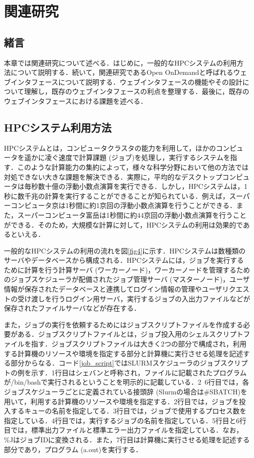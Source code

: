 
\section{関連研究}

\subsection{緒言}
本章では関連研究について述べる．はじめに，一般的なHPCシステムの利用方法について説明する．続いて，関連研究であるOpen OnDemandと呼ばれるウェブインタフェースについて説明する．ウェブインタフェースの機能やその設計について理解し，既存のウェブインタフェースの利点を整理する．最後に，既存のウェブインタフェースにおける課題を述べる．

\subsection{HPCシステム利用方法}
HPCシステムとは，コンピュータクラスタの能力を利用して，ほかのコンピュータを遥かに凌ぐ速度で計算課題 (ジョブ)を処理し，実行するシステムを指す．このような計算能力の集約によって，様々な科学分野において他の方法では対処できない大きな課題を解決できる．実際に，平均的なデスクトップコンピュータは毎秒数十億の浮動小数点演算を実行できる．しかし，HPCシステムは，1秒に数千兆の計算を実行することができることが知られている．例えば，スーパーコンピュータ京は1秒間に約1京回の浮動小数点演算を行うことができる\cite{kei}．また，スーパーコンピュータ富岳は1秒間に約44京回の浮動小数点演算を行うことができる\cite{hugaku}．そのため，大規模な計算に対して，HPCシステムの利用は効果的であるといえる．\par
一般的なHPCシステムの利用の流れを図\ref{fig4}に示す．HPCシステムは数種類のサーバやデータベースから構成される．HPCシステムには，ジョブを実行するために計算を行う計算サーバ (ワーカーノード)，ワーカーノードを管理するためのジョブスケジューラが配備されたジョブ管理サーバ (マスターノード)，ユーザ情報が保存されたデータベースと連携してログイン情報の管理やユーザリクエストの受け渡しを行うログイン用サーバ，実行するジョブの入出力ファイルなどが保存されたファイルサーバなどが存在する．\par
また，ジョブの実行を依頼するためにはジョブスクリプトファイルを作成する必要がある．ジョブスクリプトファイルとは，ジョブ投入用のシェルスクリプトファイルを指す．ジョブスクリプトファイルは大きく2つの部分で構成され，利用する計算機のリソースや環境を指定する部分と計算機に実行させる処理を記述する部分からなる．コード\ref{job_script}ではSLURMスケジューラのジョブスクリプトの例を示す．1行目はシェバンと呼称され，ファイルに記載されたプログラムが/bin/bashで実行されるということを明示的に記載している．2~6行目では，各ジョブスケジューラごとに定義されている接頭辞 (Slurmの場合は\#SBATCH)を用いて，利用する計算機のリソースや環境を指定する．2行目では，ジョブを投入するキューの名前を指定してる．3行目では，ジョブで使用するプロセス数を指定している．4行目では，実行するジョブの名前を指定している．5行目と6行目では，標準出力ファイルと標準エラー出力ファイルを指定している．なお，\%JはジョブIDに変換される．また，7行目は計算機に実行させる処理を記述する部分であり，プログラム (a.out)を実行する．\par
